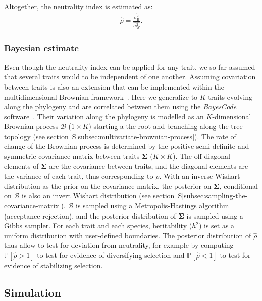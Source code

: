 \documentclass{article}
\newcommand{\UniDimArray}[1]{\bm{#1}}
\newcommand{\BiDimArray}[1]{\bm{#1}}
\newcommand{\proba}{\mathbb{P}}
\newcommand{\Heritability}{h^2}
\newcommand{\RateBetween}{\sigma^2_{\mathrm{B}}}
\newcommand{\RateWhithin}{\sigma^2_{\mathrm{W}}}
\newcommand{\EstRateBetween}{\widehat{\RateBetween}}
\newcommand{\EstRateWhithin}{\widehat{\RateWhithin}}
\newcommand{\NI}{\rho}
\newcommand{\EstNI}{\widehat{\rho}}
\newcommand{\Ntrait}{K}
\newcommand{\Covariancematrix}{\Sigma}
\newcommand{\CovarianceMatrix}{\BiDimArray{\Covariancematrix}}
\newcommand{\brownian}{\mathcal{B}}
\newcommand{\Brownian}{\UniDimArray{\brownian}}
\begin{document}
Altogether, the neutrality index is estimated as:
\begin{gather}
    \EstNI = \frac{\EstRateBetween}{\EstRateWhithin}. \label{eq:estimated-NI}
\end{gather}

\subsubsection*{Bayesian estimate}

Even though the neutrality index can be applied for any trait, we so far assumed that several traits would to be independent of one another.
Assuming covariation between traits is also an extension that can be implemented within the multidimensional Brownian framework~\cite{huelsenbeck_detecting_2003, lartillot_phylogenetic_2011, lartillot_joint_2012, latrille_inferring_2021}.
Here we generalize to $\Ntrait$ traits evolving along the phylogeny and are correlated between them using the \textit{BayesCode} software~\cite{latrille_inferring_2021}.
Their variation along the phylogeny is modelled as an $\Ntrait$-dimensional Brownian process $\Brownian$ ($1 \times \Ntrait$) starting a the root and branching along the tree topology (see section~S\ref{subsec:multivariate-brownian-process}).
The rate of change of the Brownian process is determined by the positive semi-definite and symmetric covariance matrix between traits $\CovarianceMatrix$ ($\Ntrait \times \Ntrait$).
The off-diagonal elements of $\CovarianceMatrix$ are the covariance between traits, and the diagonal elements are the variance of each trait, thus corresponding to $\NI$.
With an inverse Wishart distribution as the {prior} on the covariance matrix, the {posterior} on $\CovarianceMatrix$, conditional on $\brownian$ is also an invert Wishart distribution (see section~S\ref{subsec:sampling-the-covariance-matrix}).
$\Brownian$ is sampled using a Metropolis-Hastings algorithm (acceptance-rejection), and the posterior distribution of $\CovarianceMatrix$ is sampled using a Gibbs sampler.
For each trait and each species, heritability ($\Heritability$) is set as a uniform distribution with user-defined boundaries.
The posterior distribution of $\EstNI$ thus allow to test for deviation from neutrality, for example by computing $\proba [\EstNI > 1 ]$ to test for evidence of diversifying selection and $\proba [\EstNI < 1 ]$ to test for evidence of stabilizing selection.

\subsection*{Simulation}\label{subsec:simulations}
\end{document}
